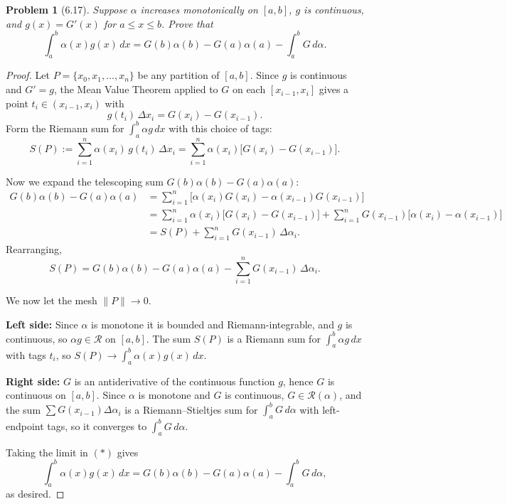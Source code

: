 \documentclass[12 pt]{article}
\newtheorem{prob}{Problem}
\begin{document}
\begin{prob}[6.17]
Suppose $\alpha$ increases monotonically on $[a, b]$, $g$ is continuous, and $g(x)=G'(x)$ for $a \leq x \leq b$. Prove that
$$
\int_{a}^{b} \alpha(x) g(x)\, dx = G(b)\alpha(b) - G(a)\alpha(a) - \int_{a}^{b} G\, d\alpha.
$$
\end{prob}
\begin{proof}
Let $P = \{x_0, x_1, \ldots, x_n\}$ be any partition of $[a,b]$. Since $g$ is continuous and $G' = g$, the Mean Value Theorem applied to $G$ on each $[x_{i-1}, x_i]$ gives a point $t_i \in (x_{i-1}, x_i)$ with
$$
g(t_i)\, \Delta x_i = G(x_i) - G(x_{i-1}).
$$
Form the Riemann sum for $\int_a^b \alpha g\, dx$ with this choice of tags:
$$
S(P) := \sum_{i=1}^{n} \alpha(x_i)\, g(t_i)\, \Delta x_i = \sum_{i=1}^{n} \alpha(x_i)\bigl[G(x_i) - G(x_{i-1})\bigr].
$$

Now we expand the telescoping sum $G(b)\alpha(b) - G(a)\alpha(a)$:
\begin{align*}
G(b)\alpha(b) - G(a)\alpha(a) &= \sum_{i=1}^{n}\bigl[\alpha(x_i)G(x_i) - \alpha(x_{i-1})G(x_{i-1})\bigr] \\
&= \sum_{i=1}^{n} \alpha(x_i)\bigl[G(x_i) - G(x_{i-1})\bigr] + \sum_{i=1}^{n} G(x_{i-1})\bigl[\alpha(x_i) - \alpha(x_{i-1})\bigr] \\
&= S(P) + \sum_{i=1}^{n} G(x_{i-1})\, \Delta \alpha_i.
\end{align*}
Rearranging,
$$
S(P) = G(b)\alpha(b) - G(a)\alpha(a) - \sum_{i=1}^{n} G(x_{i-1})\, \Delta \alpha_i. \tag{$\ast$}
$$

We now let the mesh $\|P\| \to 0$.

\textbf{Left side:} Since $\alpha$ is monotone it is bounded and Riemann-integrable, and $g$ is continuous, so $\alpha g \in \mathscr{R}$ on $[a,b]$. The sum $S(P)$ is a Riemann sum for $\int_a^b \alpha g\, dx$ with tags $t_i$, so $S(P) \to \int_a^b \alpha(x) g(x)\, dx$.

\textbf{Right side:} $G$ is an antiderivative of the continuous function $g$, hence $G$ is continuous on $[a,b]$. Since $\alpha$ is monotone and $G$ is continuous, $G \in \mathscr{R}(\alpha)$, and the sum $\sum G(x_{i-1}) \Delta \alpha_i$ is a Riemann--Stieltjes sum for $\int_a^b G\, d\alpha$ with left-endpoint tags, so it converges to $\int_a^b G\, d\alpha$.

Taking the limit in $(\ast)$ gives
$$
\int_a^b \alpha(x) g(x)\, dx = G(b)\alpha(b) - G(a)\alpha(a) - \int_a^b G\, d\alpha,
$$
as desired.
\end{proof}
\end{document}
